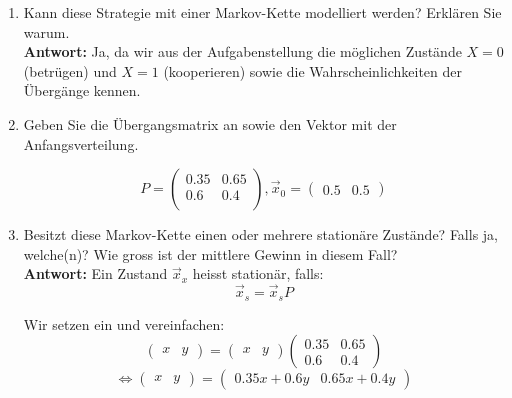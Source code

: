 \documentclass[12pt,a4paper]{article}
\begin{document}
\begin{enumerate}
\begin{enumerate}
\item Kann diese Strategie mit einer Markov-Kette modelliert werden? Erklären Sie warum.\\
\textbf{Antwort:} Ja, da wir aus der Aufgabenstellung die möglichen Zustände $X=0$ (betrügen) und $X=1$ (kooperieren) sowie die Wahrscheinlichkeiten der Übergänge kennen.
\begin{center}
\end{center}

\item Geben Sie die Übergangsmatrix an sowie den Vektor mit der Anfangsverteilung.
\begin{center}
$$P = \begin{pmatrix}
 0.35 & 0.65\\
 0.6  & 0.4\\
\end{pmatrix},
\vec x_0 = \begin{pmatrix}
 0.5 & 0.5
\end{pmatrix}$$
\end{center}
\newpage

\item Besitzt diese Markov-Kette einen oder mehrere stationäre Zustände?
Falls ja, welche(n)?
Wie gross ist der mittlere Gewinn in diesem Fall?\\
\textbf{Antwort:} Ein Zustand $\vec x_x$ heisst stationär, falls:\\
$$\vec x_s =\vec x_s P$$

Wir setzen ein und vereinfachen:
$$\begin{pmatrix}
 x & y
\end{pmatrix} = \begin{pmatrix}
 x & y
\end{pmatrix} \begin{pmatrix}
 0.35 & 0.65\\
 0.6  & 0.4
\end{pmatrix}$$
$$\Leftrightarrow \begin{pmatrix}
 x & y
\end{pmatrix} = \begin{pmatrix}
 0.35x + 0.6y & 0.65x + 0.4y
\end{pmatrix}$$


\end{enumerate}
\end{enumerate}
\end{document}
